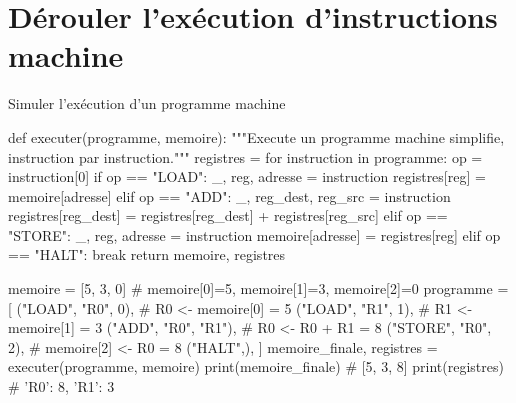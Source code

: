 \section{Dérouler l'exécution d'instructions machine}



\begin{codereference}{Simuler l'exécution d'un programme machine}
\begin{python}
def executer(programme, memoire):
    """Execute un programme machine simplifie, instruction par instruction."""
    registres = {}
    for instruction in programme:
        op = instruction[0]
        if op == "LOAD":
            _, reg, adresse = instruction
            registres[reg] = memoire[adresse]
        elif op == "ADD":
            _, reg_dest, reg_src = instruction
            registres[reg_dest] = registres[reg_dest] + registres[reg_src]
        elif op == "STORE":
            _, reg, adresse = instruction
            memoire[adresse] = registres[reg]
        elif op == "HALT":
            break
    return memoire, registres

memoire = [5, 3, 0]  # memoire[0]=5, memoire[1]=3, memoire[2]=0
programme = [
    ("LOAD", "R0", 0),   # R0 <- memoire[0] = 5
    ("LOAD", "R1", 1),   # R1 <- memoire[1] = 3
    ("ADD", "R0", "R1"), # R0 <- R0 + R1 = 8
    ("STORE", "R0", 2),  # memoire[2] <- R0 = 8
    ("HALT",),
]
memoire_finale, registres = executer(programme, memoire)
print(memoire_finale)   # [5, 3, 8]
print(registres)        # {'R0': 8, 'R1': 3}
\end{python}
\end{codereference}

